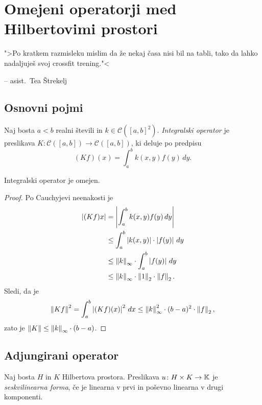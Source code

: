 \section{Omejeni operatorji med Hilbertovimi prostori}

\epigraph{">Po kratkem razmisleku mislim da že nekaj časa nisi bil
na tabli, tako da lahko nadaljuješ svoj crossfit
trening."<}{-- asist.~Tea Štrekelj}

\subsection{Osnovni pojmi}

\begin{definicija}
Naj bosta $a < b$ realni števili in $k \in \mathcal{C}([a,b]^2)$.
\emph{Integralski operator} je
preslikava $K \colon \mathcal{C}([a,b]) \to \mathcal{C}([a,b])$, ki
deluje po predpisu
\[
(Kf)(x) = \int_a^b k(x,y) f(y)\,dy.
\]
\end{definicija}

\begin{trditev}
Integralski operator je omejen.
\end{trditev}

\begin{proof}
Po Cauchyjevi neenakosti je
\begin{align*}
\left\lvert (Kf)x\right\rvert &= \left\lvert \int_a^b k(x,y) f(y)\,dy\right\rvert
\\
&\leq
\int_a^b \left\lvert k(x,y)\right\rvert \cdot \left\lvert f(y)\right\rvert\,dy
\\
&\leq
\left\lVert k\right\rVert_\infty \cdot \int_a^b \left\lvert f(y)\right\rvert\,dy
\\
&\leq
\left\lVert k\right\rVert_\infty \cdot \left\lVert 1\right\rVert_2 \cdot \left\lVert f\right\rVert_2.
\end{align*}
Sledi, da je
\[
\left\lVert Kf\right\rVert^2 = \int_a^b \left\lvert (Kf)(x)\right\rvert^2\,dx \leq
\left\lVert k\right\rVert_\infty^2 \cdot (b-a)^2 \cdot \left\lVert f\right\rVert_2,
\]
zato je $\left\lVert K\right\rVert \leq \left\lVert k\right\rVert_\infty \cdot (b-a)$.
\end{proof}

\newpage

\subsection{Adjungirani operator}

\begin{definicija}
Naj bosta $H$ in $K$ Hilbertova prostora. Preslikava
$u \colon H \times K \to \mathbb{K}$ je
\emph{seskvilinearna forma}, če je
linearna v prvi in poševno linearna v drugi komponenti.
\end{definicija}

